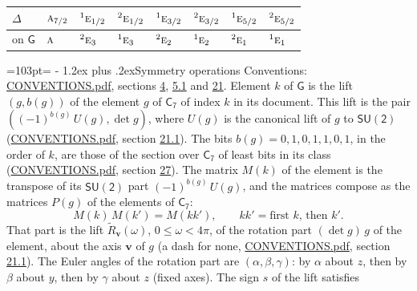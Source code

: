 \documentclass[10pt,a4paper]{article}
\makeatletter
\renewcommand\section{\@startsection{section}{1}{\z@}{-3ex plus -1ex minus -.2ex}%
  {1.2ex plus .2ex}{\normalfont\large\sffamily\bfseries\color{parttitle}}}
\newcommand{\needspace}[1]{\par\penalty-100\begingroup\dimen0=#1\relax\dimen2=\pagegoal
  \advance\dimen2-\pagetotal\ifdim\dimen0>\dimen2\relax\ifdim\dimen2>0pt\vfil\break\fi\fi
  \endgroup}
\numberwithin{equation}{section}
\newcommand{\grp}[1]{\mathsf{#1}}
\newcommand{\irr}[1]{\text{\normalfont\scshape #1}}
\newcommand{\conjpair}[1]{{}^{#1}}
\newcommand{\vv}{\mathbf{v}}
\newcommand{\lift}[1]{\tilde{#1}}
\makeatother
\begin{document}
\begin{center}\begin{tabular}{@{}llllllll@{}}\toprule
$\Delta$ & $\irr{a}_{7/2}$ & $\conjpair{1}\irr{e}_{1/2}$ & $\conjpair{2}\irr{e}_{1/2}$ & $\conjpair{1}\irr{e}_{3/2}$ & $\conjpair{2}\irr{e}_{3/2}$ & $\conjpair{1}\irr{e}_{5/2}$ & $\conjpair{2}\irr{e}_{5/2}$\\\midrule
on $\grp{G}$ & $\irr{a}$ & $\conjpair{2}\irr{e}_{3}$ & $\conjpair{1}\irr{e}_{3}$ & $\conjpair{2}\irr{e}_{2}$ & $\conjpair{1}\irr{e}_{2}$ & $\conjpair{2}\irr{e}_{1}$ & $\conjpair{1}\irr{e}_{1}$\\
\bottomrule\end{tabular}\end{center}
\needspace{103pt}
\section{Symmetry operations}\label{s:elements}
Conventions: \href{../../CONVENTIONS.pdf}{CONVENTIONS.pdf}, sections \href{../../../rotation/CONVENTIONS.pdf\#conv.4}{4}, \href{../../../rotation/CONVENTIONS.pdf\#conv.5.1}{5.1} and \href{../../CONVENTIONS.pdf\#conv.21}{21}.
\leavevmode\label{n:index.element}\label{n:element.g}\label{n:function.section}Element $k$ of $\grp{G}$ is the lift $(g, b(g))$ of the element $g$ of \href{../../../rotation/data/pdf/C7.pdf}{$\grp{C_{7}}$} of index $k$ in its document. This lift is the pair $((-1)^{b(g)}\,U(g), \det g)$, where $U(g)$ is the canonical lift of $g$ to $\grp{SU(2)}$ (\href{../../CONVENTIONS.pdf}{CONVENTIONS.pdf}, section \href{../../CONVENTIONS.pdf\#conv.21.1}{21.1}). The bits $b(g) = 0, 1, 0, 1, 1, 0, 1$, in the order of $k$, are those of the section over $\grp{C_{7}}$ of least bits in its class (\href{../../CONVENTIONS.pdf}{CONVENTIONS.pdf}, section \href{../../CONVENTIONS.pdf\#conv.27}{27}). \label{n:matrix.element.pin}\label{n:matrix.element}The matrix $M(k)$ of the element is the transpose of its $\grp{SU(2)}$ part $(-1)^{b(g)}\,U(g)$, and the matrices compose as the matrices $P(g)$ of the elements of $\grp{C_{7}}$:
\begin{equation}\label{e:mprod}M(k)\,M(k') = M(kk'),\qquad kk' = \text{first } k\text{, then } k'.\end{equation}
\leavevmode\label{n:angle.omega}\label{n:vector.axis}\label{n:vector.pole}That part is the lift $\lift{R}_{\vv}(\omega)$, $0 \le \omega < 4\pi$, of the rotation part $(\det g)\,g$ of the element, about the axis $\vv$ of $g$ (a dash for none, \href{../../CONVENTIONS.pdf}{CONVENTIONS.pdf}, section \href{../../CONVENTIONS.pdf\#conv.21.1}{21.1}). \label{n:angle.euler.alpha}\label{n:angle.euler.beta}\label{n:angle.euler.gamma}\label{n:vector.coordinates}The Euler angles of the rotation part are $(\alpha,\beta,\gamma)$: by $\alpha$ about $z$, then by $\beta$ about $y$, then by $\gamma$ about $z$ (fixed axes). \label{n:local.euler.sign}The sign $s$ of the lift satisfies
\end{document}
